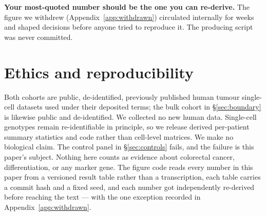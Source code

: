 \documentclass{article}
\begin{document}
\textbf{Your most-quoted number should be the one you can re-derive.} The figure
we withdrew (Appendix~\ref{app:withdrawn}) circulated internally for weeks and
shaped decisions before anyone tried to reproduce it. The producing script was
never committed.

\section*{Ethics and reproducibility}

Both cohorts are public, de-identified, previously published human tumour
single-cell datasets used under their deposited terms; the bulk cohort in
\S\ref{sec:boundary} is likewise public and de-identified. We collected no new
human data. Single-cell genotypes remain re-identifiable in principle, so we
release derived per-patient summary statistics and code rather than cell-level
matrices. We make no biological claim. The control panel in \S\ref{sec:controls}
fails, and the failure is this paper's subject. Nothing here counts as evidence
about colorectal cancer, differentiation, or any marker gene. The figure code
reads every number in this paper from a versioned result table rather than a
transcription, each table carries a commit hash and a fixed seed, and each number
got independently re-derived before reaching the text --- with the one exception
recorded in Appendix~\ref{app:withdrawn}.






\clearpage
\appendix

\end{document}
